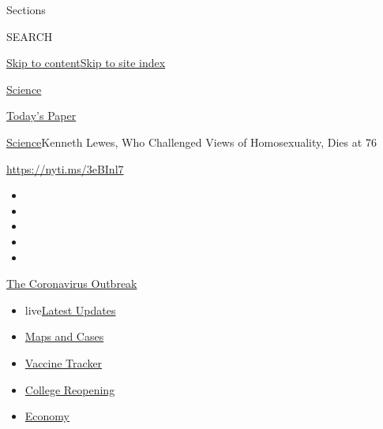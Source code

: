 Sections

SEARCH

\protect\hyperlink{site-content}{Skip to
content}\protect\hyperlink{site-index}{Skip to site index}

\href{https://www.nytimes.com/section/science}{Science}

\href{https://myaccount.nytimes.com/auth/login?response_type=cookie\&client_id=vi}{}

\href{https://www.nytimes.com/section/todayspaper}{Today's Paper}

\href{/section/science}{Science}\textbar{}Kenneth Lewes, Who Challenged
Views of Homosexuality, Dies at 76

\url{https://nyti.ms/3eBInl7}

\begin{itemize}
\item
\item
\item
\item
\item
\end{itemize}

\href{https://www.nytimes.com/news-event/coronavirus?action=click\&pgtype=Article\&state=default\&region=TOP_BANNER\&context=storylines_menu}{The
Coronavirus Outbreak}

\begin{itemize}
\tightlist
\item
  live\href{https://www.nytimes.com/2020/08/03/world/coronavirus-covid-19.html?action=click\&pgtype=Article\&state=default\&region=TOP_BANNER\&context=storylines_menu}{Latest
  Updates}
\item
  \href{https://www.nytimes.com/interactive/2020/us/coronavirus-us-cases.html?action=click\&pgtype=Article\&state=default\&region=TOP_BANNER\&context=storylines_menu}{Maps
  and Cases}
\item
  \href{https://www.nytimes.com/interactive/2020/science/coronavirus-vaccine-tracker.html?action=click\&pgtype=Article\&state=default\&region=TOP_BANNER\&context=storylines_menu}{Vaccine
  Tracker}
\item
  \href{https://www.nytimes.com/2020/08/02/us/covid-college-reopening.html?action=click\&pgtype=Article\&state=default\&region=TOP_BANNER\&context=storylines_menu}{College
  Reopening}
\item
  \href{https://www.nytimes.com/live/2020/08/03/business/stock-market-today-coronavirus?action=click\&pgtype=Article\&state=default\&region=TOP_BANNER\&context=storylines_menu}{Economy}
\end{itemize}

